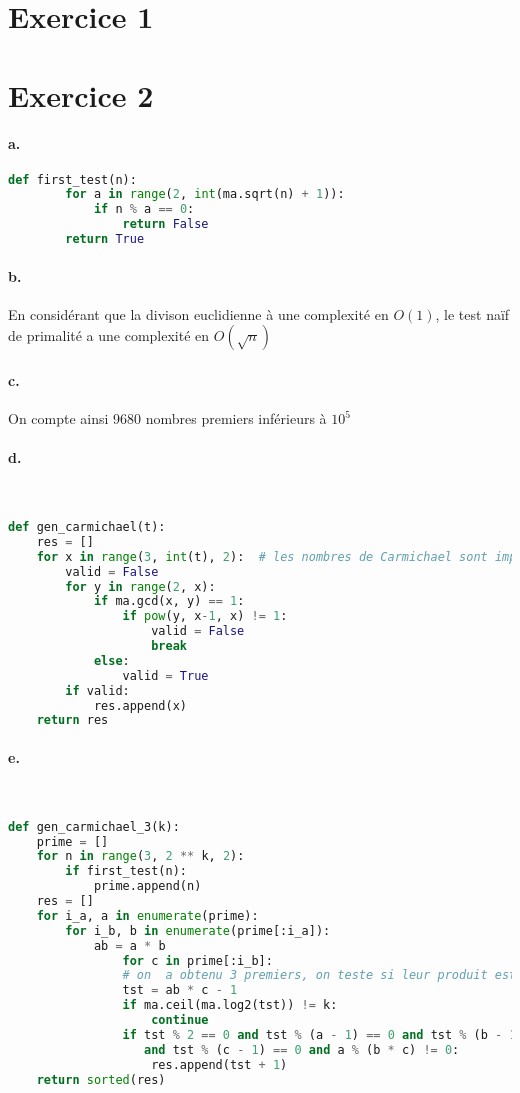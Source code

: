 \documentclass[french]{article}
\begin{document}
\section*{Exercice 1}

\section*{Exercice 2}
\paragraph{a.}  
\begin{center}
\begin{lstlisting}[language=Python, belowskip=-1 \baselineskip]
    def first_test(n):
        for a in range(2, int(ma.sqrt(n) + 1)):
            if n % a == 0:
                return False
        return True
\end{lstlisting}
\end{center}
\paragraph{b.} En considérant que la divison euclidienne à une complexité en $O(1)$, le test naïf de primalité a une complexité en $O(\sqrt{n})$
\paragraph{c.} On compte ainsi 9680 nombres premiers inférieurs à $10^5$

\paragraph{d.} \
\begin{lstlisting}[language=Python, belowskip=-1 \baselineskip]
def gen_carmichael(t):
    res = []
    for x in range(3, int(t), 2):  # les nombres de Carmichael sont impairs
        valid = False
        for y in range(2, x):
            if ma.gcd(x, y) == 1:
                if pow(y, x-1, x) != 1:
                    valid = False
                    break
            else:
                valid = True
        if valid:
            res.append(x)
    return res
\end{lstlisting}

\paragraph{e.} \
\begin{lstlisting}[language=Python, belowskip=-1 \baselineskip]
    def gen_carmichael_3(k):
    prime = []
    for n in range(3, 2 ** k, 2):
        if first_test(n):
            prime.append(n)
    res = []
    for i_a, a in enumerate(prime):
        for i_b, b in enumerate(prime[:i_a]):
            ab = a * b
                for c in prime[:i_b]:
                # on  a obtenu 3 premiers, on teste si leur produit est Carmichael
                tst = ab * c - 1
                if ma.ceil(ma.log2(tst)) != k:
                    continue
                if tst % 2 == 0 and tst % (a - 1) == 0 and tst % (b - 1) == 0 
                   and tst % (c - 1) == 0 and a % (b * c) != 0:
                    res.append(tst + 1)
    return sorted(res)
\end{lstlisting}
\end{document}
